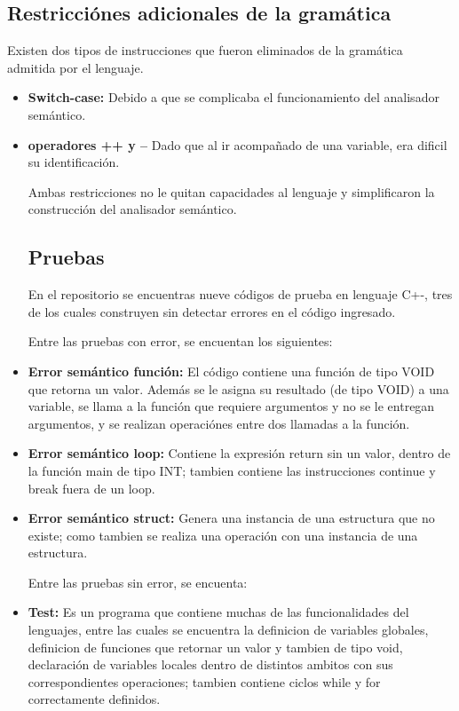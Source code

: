 \documentclass[12pt]{article}
\begin{document}
\begin{itemize}
\subsection*{Restricciónes adicionales de la gramática}

Existen dos tipos de instrucciones que fueron eliminados de la gramática admitida por el lenguaje.

\begin{itemize}
    \item \textbf{Switch-case: } Debido a que se complicaba el funcionamiento del analisador semántico.
    \item \textbf{operadores ++ y --} Dado que al ir acompañado de una variable, era dificil su identificación.

Ambas restricciones no le quitan capacidades al lenguaje y simplificaron la construcción del analisador semántico.


\section*{Pruebas}
En el repositorio se encuentras nueve c\'odigos de prueba en lenguaje C+-, tres de los cuales construyen sin detectar errores en el código ingresado.

Entre las pruebas con error, se encuentan los siguientes:
\item \textbf{Error semántico función: } El código contiene una función de tipo VOID que retorna un valor. Además se le asigna su resultado (de tipo VOID) a una variable, se llama a la función que requiere argumentos y no se le entregan argumentos, y se realizan operaciónes entre dos llamadas a la función.

\item \textbf{Error semántico loop: } Contiene la expresión return sin un valor, dentro de la función main de tipo INT; tambien contiene las instrucciones continue y break fuera de un loop.  

\item \textbf{Error semántico struct: } Genera una instancia de una estructura que no existe; como tambien se realiza una operación con una instancia de una estructura.


Entre las pruebas sin error, se encuenta:
\item \textbf{Test: } Es un programa que contiene muchas de las funcionalidades del lenguajes, entre las cuales se encuentra la definicion de variables globales, definicion de funciones que retornar un valor y tambien de tipo void, declaración de variables locales dentro de distintos ambitos con sus correspondientes operaciones; tambien contiene ciclos while y for correctamente definidos.


\end{itemize}
\end{itemize}
\end{document}
